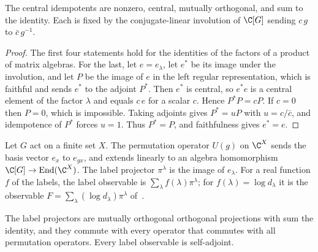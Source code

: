\begin{lemma}
    \label{lem:irrep_central_idempotents}
    \leanok
    The central idempotents are nonzero, central, mutually orthogonal, and sum
    to the identity. Each is fixed by the conjugate-linear involution of
    $\C[G]$ sending $c\,g$ to $\bar c\,g^{-1}$.
\end{lemma}

\begin{proof}\leanok
    The first four statements hold for the identities of the factors of a
    product of matrix algebras. For the last, let $e=e_\lambda$, let $e^\ast$
    be its image under the involution, and let $P$ be the image of $e$ in the
    left regular representation, which is faithful and sends $e^\ast$ to the
    adjoint $P^\ast$. Then $e^\ast$ is central, so $e^\ast e$ is a central
    element of the factor $\lambda$ and equals $c\,e$ for a scalar $c$. Hence
    $P^\ast P=cP$. If $c=0$ then $P=0$, which is impossible. Taking adjoints
    gives $P^\ast=uP$ with $u=c/\bar c$, and idempotence of $P^\ast$ forces
    $u=1$. Thus $P^\ast=P$, and faithfulness gives $e^\ast=e$.
\end{proof}

\begin{definition}
    \label{def:label_projectors}
    \leanok
    Let $G$ act on a finite set $X$. The permutation operator $U(g)$ on $\C^X$
    sends the basis vector $e_x$ to $e_{gx}$, and extends linearly to an algebra
    homomorphism $\C[G]\to\mathrm{End}(\C^X)$. The label projector $\pi^\lambda$
    is the image of $e_\lambda$. For a real function $f$ of the labels, the
    label observable is $\sum_\lambda f(\lambda)\pi^\lambda$; for
    $f(\lambda)=\log d_\lambda$ it is the observable
    $F=\sum_\lambda(\log d_\lambda)\pi^\lambda$
    of~\cite[Section~6.1]{OpenAI2026AreaLaw}.
\end{definition}

\begin{lemma}
    \label{lem:label_projectors}
    \leanok
    The label projectors are mutually orthogonal orthogonal projections with sum
    the identity, and they commute with every operator that commutes with all
    permutation operators. Every label observable is self-adjoint.
\end{lemma}

